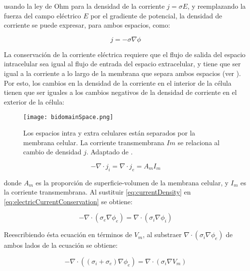 usando la ley de Ohm para la densidad de la corriente $j = \sigma E$, y reemplazando la fuerza del campo eléctrico $E$ por el gradiente de potencial, la densidad de corriente se puede expresar, para ambos espacios, como:

\begin{equation}
\label{eq:currentDensity}
	j = - \sigma \nabla \phi
\end{equation}

La conservación de la corriente eléctrica requiere que el flujo de salida del espacio intracelular sea igual al flujo de entrada del espacio extracelular, y tiene que ser igual a la corriente a lo largo de la membrana que separa ambos espacios (ver ). Por esto, los cambios en la densidad de la corriente en el interior de la célula tienen que ser iguales a los cambios negativos de la densidad de corriente en el exterior de la célula:

\begin{figure}[!ht]
	\centering
		\texttt{[image: bidomainSpace.png]}
	\caption[Diagrama del espacio bidominio.]{Los espacios intra y extra celulares están separados por la membrana celular. La corriente transmembrana $Im$ se relaciona al cambio de densidad $j$. Adaptado de \citep{matthias20113d}.}
	\label{fig:bidomainSpace}
\end{figure}

\begin{equation}
\label{eq:electricCurrentConservation}
	-\nabla \cdot j_i = \nabla \cdot j_e = A_m I_m
\end{equation}

donde $A_m$ es la proporción de superficie-volumen de la membrana celular, y $I_m$ es la corriente transmembrana. Al sustituir \ref{eq:currentDensity} en \ref{eq:electricCurrentConservation} se obtiene:

\begin{equation}
	-\nabla \cdot (\sigma_e \nabla \phi_e) = \nabla \cdot (\sigma_i \nabla \phi_i)
\end{equation}

Reescribiendo ésta ecuación en términos de $V_m$, al substraer $\nabla \cdot (\sigma_i \nabla \phi_e)$ de ambos lados de la ecuación se obtiene:

\begin{equation}
\label{eq:bidomain1}
	-\nabla \cdot ((\sigma_i + \sigma_e)\nabla \phi_e) = \nabla \cdot (\sigma_i \nabla V_m)
\end{equation}

